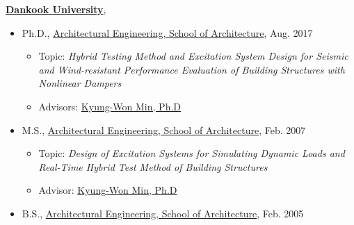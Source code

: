 \nocite{*}
\href{http://www.dankook.ac.kr/}{\textbf{Dankook University}},
\begin{itemize}
  \item Ph.D., \href{http://cms.dankook.ac.kr/web/archi} {Architectural Engineering, School of Architecture}, Aug. 2017
        \begin{itemize}
          \item Topic: \emph{Hybrid Testing Method and Excitation System Design for Seismic and Wind-resistant Performance Evaluation of Building Structures with Nonlinear Dampers}
          \item Advisors: \href{http://cms.dankook.ac.kr/web/archi/-16?p_p_id=DeptInfo_WAR_empInfoportlet&p_p_lifecycle=0&p_p_state=normal&p_p_mode=view&p_p_col_id=column-2&p_p_col_count=1&_DeptInfo_WAR_empInfoportlet_empId=2zEyEnhbhLlys2HRljBFWg%3D%3D&_DeptInfo_WAR_empInfoportlet_action=view_message}{Kyung-Won Min, Ph.D}
        \end{itemize}

  \item M.S., \href{http://cms.dankook.ac.kr/web/archi} {Architectural Engineering, School of Architecture}, Feb. 2007
        \begin{itemize}
          \item Topic: \emph{Design of Excitation Systems for Simulating Dynamic Loads and Real-Time Hybrid Test Method of Building Structures}
          \item Advisor: \href{http://cms.dankook.ac.kr/web/archi/-16?p_p_id=DeptInfo_WAR_empInfoportlet&p_p_lifecycle=0&p_p_state=normal&p_p_mode=view&p_p_col_id=column-2&p_p_col_count=1&_DeptInfo_WAR_empInfoportlet_empId=2zEyEnhbhLlys2HRljBFWg%3D%3D&_DeptInfo_WAR_empInfoportlet_action=view_message} {Kyung-Won Min, Ph.D}
        \end{itemize}
  \item B.S., \href{http://cms.dankook.ac.kr/web/archi}{Architectural Engineering, School of Architecture}, Feb. 2005
\end{itemize}
